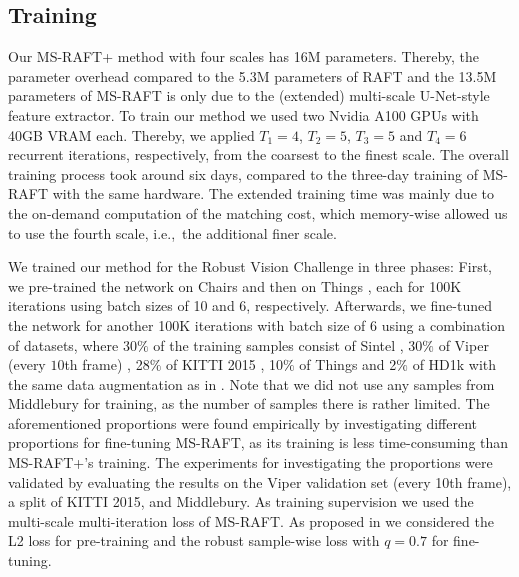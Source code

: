 \documentclass[conference,compsoc,a4paper]{IEEEtran}[2015/08/26]
\begin{document}
\subsection{Training}
\label{subsec:training}
Our MS-RAFT+ method with four scales has 16M parameters.
Thereby, the parameter overhead compared to the 5.3M parameters of RAFT and the 13.5M parameters of MS-RAFT is only due to the (extended) multi-scale U-Net-style feature extractor.
To train our method we used two Nvidia A100 GPUs with 40GB VRAM each.
Thereby, we applied $T_1=4$, $T_2=5$, $T_3=5$ and $T_4=6$ recurrent iterations, respectively, from the coarsest to the finest scale.
The overall training process took
around six days, compared to the three-day training of MS-RAFT with the same hardware. The extended training time was mainly due to the on-demand computation of the matching cost, which memory-wise allowed us to use the 
fourth scale, i.e.,\ the additional finer scale.

We trained our method for the Robust Vision Challenge in three phases: First, we pre-trained the network on Chairs \cite{Dosovitskiy2015_FlowNet} and then on Things \cite{Mayer2016_FTH}, each for 100K iterations using batch sizes of 10 and 6, respectively. 
Afterwards, we fine-tuned the network for another 100K iterations with batch size of 6 using a combination of datasets, where 30$\%$ of the training samples consist of Sintel \cite{Butler2012_Sintel}, 30$\%$ of Viper (every $10$th frame) \cite{Richter2017_VIPER}, 28$\%$ of KITTI 2015 \cite{Menze2015_KITTI}, 10$\%$ of Things \cite{Mayer2016_FTH} and 2$\%$ of HD1k \cite{Kondermann2016} with the same data augmentation as in \cite{Teed2020_RAFT}. 
Note that we did not use any samples from Middlebury \cite{Baker2011_MiddleburyFlow} for training, as the number of samples there is rather limited. 
The aforementioned proportions were found empirically by investigating different proportions for fine-tuning MS-RAFT, as its training is less time-consuming than MS-RAFT+'s training. The experiments for investigating the proportions were validated by evaluating the results on the Viper validation set (every 10th frame), a split of KITTI 2015, and Middlebury. As training supervision we used the multi-scale multi-iteration loss of MS-RAFT. As proposed in \cite{Jahedi2022_MSRAFT} we considered the L2 loss for pre-training and the robust sample-wise loss with $q=0.7$ for fine-tuning.
\end{document}
